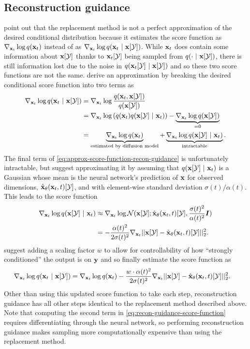 \subsection{Reconstruction guidance} \label{sec:reconstruction-guidance}
\citet{ho2022video} point out that the replacement method is not a perfect approximation of the desired conditional distribution because it estimates the score function as $\nabla_{{\mathbf{x}}_t} \log q({\mathbf{x}}_t)$ instead of as $\nabla_{{\mathbf{x}}_t} \log q({\mathbf{x}}_t~|~{\mathbf{x}}[{\mathcal{Y}}])$. While ${\mathbf{x}}_t$ does contain some information about ${\mathbf{x}}[{\mathcal{Y}}]$ thanks to ${\mathbf{x}}_t[{\mathcal{Y}}]$ being sampled from $q(\cdot ~|~ {\mathbf{x}}[{\mathcal{Y}}])$, there is still information lost due to the noise in $q({\mathbf{x}}_t[{\mathcal{Y}}] ~|~ {\mathbf{x}}[{\mathcal{Y}}])$ and so these two score functions are not the same. \citet{ho2022video} derive an approximation by breaking the desired conditional score function into two terms as
\begin{align}
    \nabla_{{\mathbf{x}}_t} \log q({\mathbf{x}}_t~|~{\mathbf{x}}[{\mathcal{Y}}]) &= \nabla_{{\mathbf{x}}_t} \log \frac{q({\mathbf{x}}_t, {\mathbf{x}}[{\mathcal{Y}}])}{q({\mathbf{x}}[{\mathcal{Y}}])}\\
    &= \nabla_{{\mathbf{x}}_t} \log \left( q({\mathbf{x}}_t) q({\mathbf{x}}[{\mathcal{Y}}]~|~{\mathbf{x}}_t) \right) - \underbrace{\nabla_{{\mathbf{x}}_t} \log q({\mathbf{x}}[{\mathcal{Y}}])}_{=0} \\
    &= \underbrace{\nabla_{{\mathbf{x}}_t} \log q({\mathbf{x}}_t)}_\text{estimated by diffusion model} + \underbrace{\nabla_{{\mathbf{x}}_t} \log q({\mathbf{x}}[{\mathcal{Y}}]~|~{\mathbf{x}}_t)}_\text{intractable}. \label{eq:approx-score-function-recon-guidance}
\end{align}
The final term of \cref{eq:approx-score-function-recon-guidance} is unfortunately intractable, but \citet{ho2022video} suggest approximating it by assuming that $q({\mathbf{x}}[{\mathcal{Y}}]~|~{\mathbf{x}}_t)$ is a Gaussian whose mean is the neural network's prediction of ${\mathbf{x}}$ for observed dimensions, $\hat{{\mathbf{x}}}_\theta({\mathbf{x}}_t, t)[{\mathcal{Y}}]$, and with element-wise standard deviation $\sigma(t) / \alpha(t)$. This leads to the score function
\begin{align}
    \nabla_{{\mathbf{x}}_t} \log q({\mathbf{x}}[{\mathcal{Y}}]~|~{\mathbf{x}}_t) &\approx \nabla_{{\mathbf{x}}_t} \log {\mathcal{N}}( {\mathbf{x}}[{\mathcal{Y}}]; \hat{{\mathbf{x}}}_\theta({\mathbf{x}}_t, t)[{\mathcal{Y}}], \frac{\sigma(t)^2}{\alpha(t)^2} {\bm{I}} ) \\
    &= -\frac{\alpha(t)^2}{2\sigma(t)^2} \nabla_{{\mathbf{x}}_t} || {\mathbf{x}}[{\mathcal{Y}}] - \hat{{\mathbf{x}}}_\theta({\mathbf{x}}_t, t)[{\mathcal{Y}}] ||_2^2.
\end{align}
\citet{ho2022video} suggest adding a scaling factor $w$ to allow for controllability of how ``strongly conditioned'' the output is on ${\mathbf{y}}$ and so finally estimate the score function as 
\begin{align}
    \nabla_{{\mathbf{x}}_t} \log q({\mathbf{x}}_t~|~{\mathbf{x}}[{\mathcal{Y}}]) &= \nabla_{{\mathbf{x}}_t} \log q({\mathbf{x}}_t) - \frac{w \cdot \alpha(t)^2}{2\sigma(t)^2} \nabla_{{\mathbf{x}}_t} || {\mathbf{x}}[{\mathcal{Y}}] - \hat{{\mathbf{x}}}_\theta({\mathbf{x}}_t, t)[{\mathcal{Y}}] ||_2^2 . \label{eq:recon-guidance-score-function}
\end{align}
Other than using this updated score function to take each step, reconstruction guidance has all other steps identical to the replacement method described above. Note that computing the second term in \cref{eq:recon-guidance-score-function} requires differentiating through the neural network, so performing reconstruction guidance makes sampling more computationally expensive than using the replacement method. 

